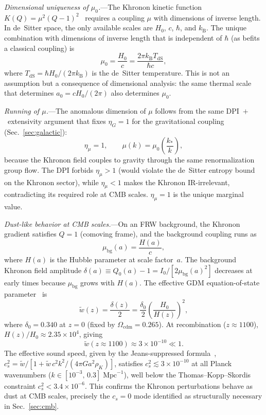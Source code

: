 \documentclass[prd,twocolumn,superscriptaddress,longbibliography,floatfix]{revtex4-2}
\newcommand{\kB}{k_{\mathrm{B}}}
\begin{document}
\emph{Dimensional uniqueness of $\mu_0$.}---The Khronon kinetic
function $K(Q) = \mu^2(Q - 1)^2$~\cite{Blanchet2024} requires
a coupling $\mu$ with dimensions of inverse length.  In
de~Sitter space, the only available scales are $H_0$, $c$, $\hbar$,
and $\kB$.  The unique combination with dimensions of inverse
length that is independent of $\hbar$ (as befits a classical
coupling) is
\begin{equation}
\mu_0 = \frac{H_0}{c}
= \frac{2\pi \kB T_{\mathrm{dS}}}{\hbar c},
\label{eq:mu0}
\end{equation}
where $T_{\mathrm{dS}} = \hbar H_0/(2\pi \kB)$ is the
de~Sitter temperature.  This is not an assumption but a
consequence of dimensional analysis: the same thermal scale
that determines $a_0 = cH_0/(2\pi)$ also determines
$\mu_0$.

\emph{Running of $\mu$.}---The anomalous dimension of $\mu$
follows from the same DPI~$+$~extensivity argument that
fixes $\eta_G = 1$ for the gravitational coupling
(Sec.~\ref{sec:galactic}):
\begin{equation}
\eta_\mu = 1, \qquad
\mu(k) = \mu_0\!\left(\frac{k_*}{k}\right),
\label{eq:mu_running}
\end{equation}
because the Khronon field couples to gravity through the same
renormalization group flow.  The DPI forbids $\eta_\mu > 1$
(would violate the de~Sitter entropy bound on the Khronon
sector), while $\eta_\mu < 1$ makes the Khronon IR-irrelevant,
contradicting its required role at CMB scales.
$\eta_\mu = 1$ is the unique marginal value.

\emph{Dust-like behavior at CMB scales.}---On an FRW
background, the Khronon gradient satisfies $Q = 1$ (comoving
frame), and the background coupling runs as
\begin{equation}
\mu_{\mathrm{bg}}(a) = \frac{H(a)}{c},
\label{eq:mu_bg}
\end{equation}
where $H(a)$ is the Hubble parameter at scale factor~$a$.
The background Khronon field amplitude
$\delta(a) \equiv Q_0(a) - 1 = I_0/[2\mu_{\mathrm{bg}}(a)^2]$
decreases at early times because $\mu_{\mathrm{bg}}$ grows
with $H(a)$.  The effective GDM equation-of-state
parameter~\cite{Blanchet2024} is
\begin{equation}
\tilde{w}(z) = \frac{\delta(z)}{2}
= \frac{\delta_0}{2}\!\left(\frac{H_0}{H(z)}\right)^{\!2},
\label{eq:w_tilde}
\end{equation}
where $\delta_0 = 0.340$ at $z = 0$
(fixed by $\Omega_{\mathrm{cdm}} = 0.265$).
At recombination ($z \approx 1100$),
$H(z)/H_0 \approx 2.35 \times 10^4$, giving
\begin{equation}
\tilde{w}(z \approx 1100) \approx 3 \times 10^{-10}
\ll 1.
\label{eq:w_dust}
\end{equation}
The effective sound speed, given by the
Jeans-suppressed formula~\cite{Blanchet2024},
$c_s^2 = \tilde{w}/[1 + \tilde{w}\,c^2 k^2/(4\pi G a^2
\rho_K)]$, satisfies $c_s^2 \lesssim 3 \times 10^{-10}$
at all Planck wavenumbers
($k \in [10^{-3},\,0.3]\;\mathrm{Mpc}^{-1}$),
well below the Thomas--Kopp--Skordis~\cite{TKS2016}
constraint $c_s^2 < 3.4 \times 10^{-6}$.
This confirms the Khronon perturbations behave as dust at
CMB scales, precisely the $c_s = 0$ mode identified as
structurally necessary in Sec.~\ref{sec:cmb}.
\end{document}
